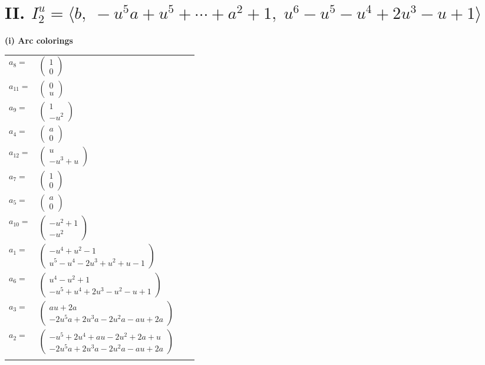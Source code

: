 \documentclass[1p]{elsarticle_modified}
\theoremstyle{definition}
\begin{document}
\centering \section*{II. $I^u_{2}= \langle b,\;- u^5 a+u^5+\cdots+a^2+1,\;u^6- u^5- u^4+2 u^3- u+1 \rangle$}
\flushleft \textbf{(i) Arc colorings}\\
\begin{tabular}{m{7pt} m{180pt} m{7pt} m{180pt} }
\flushright $a_{8}=$&$\begin{pmatrix}1\\0\end{pmatrix}$ \\
\flushright $a_{11}=$&$\begin{pmatrix}0\\u\end{pmatrix}$ \\
\flushright $a_{9}=$&$\begin{pmatrix}1\\- u^2\end{pmatrix}$ \\
\flushright $a_{4}=$&$\begin{pmatrix}a\\0\end{pmatrix}$ \\
\flushright $a_{12}=$&$\begin{pmatrix}u\\- u^3+u\end{pmatrix}$ \\
\flushright $a_{7}=$&$\begin{pmatrix}1\\0\end{pmatrix}$ \\
\flushright $a_{5}=$&$\begin{pmatrix}a\\0\end{pmatrix}$ \\
\flushright $a_{10}=$&$\begin{pmatrix}- u^2+1\\- u^2\end{pmatrix}$ \\
\flushright $a_{1}=$&$\begin{pmatrix}- u^4+u^2-1\\u^5- u^4-2 u^3+u^2+u-1\end{pmatrix}$ \\
\flushright $a_{6}=$&$\begin{pmatrix}u^4- u^2+1\\- u^5+u^4+2 u^3- u^2- u+1\end{pmatrix}$ \\
\flushright $a_{3}=$&$\begin{pmatrix}a u+2 a\\-2 u^5 a+2 u^3 a-2 u^2 a- a u+2 a\end{pmatrix}$ \\
\flushright $a_{2}=$&$\begin{pmatrix}- u^5+2 u^4+a u-2 u^2+2 a+u\\-2 u^5 a+2 u^3 a-2 u^2 a- a u+2 a\end{pmatrix}$\\&\end{tabular}
\end{document}
